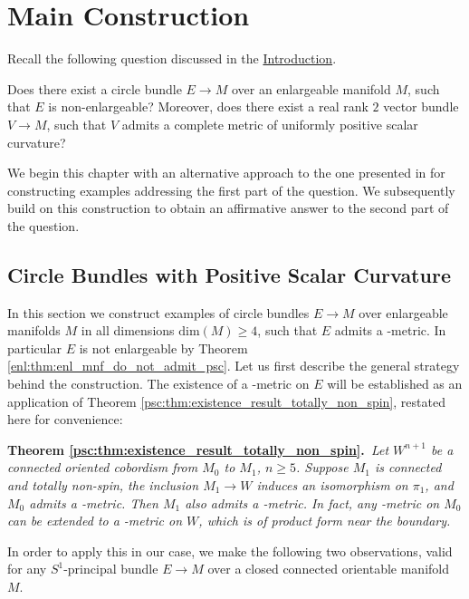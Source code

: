 \chapter{Main Construction}
\label{chapter:main_construction}

Recall the following question discussed in the \hyperref[chapter:intro]{Introduction}.

\begin{question*}
    Does there exist a circle bundle $E \to M$ over an enlargeable manifold $M$, such that $E$ is non-enlargeable? Moreover, does there exist a real rank $2$ vector bundle $V \to M$, such that $V$ admits a complete metric of uniformly positive scalar curvature?
\end{question*}

We begin this chapter with an alternative approach to the one presented in \cite{kumar2025circle} for constructing examples addressing the first part of the question. We subsequently build on this construction to obtain an affirmative answer to the second part of the question.  

\section{Circle Bundles with Positive Scalar Curvature}

 In this section we construct examples of circle bundles $E \to M$ over enlargeable manifolds $M$ in all dimensions $\mathrm{dim}(M) \geq 4$, such that $E$ admits a \psc-metric. In particular $E$ is not enlargeable by Theorem \ref{enl:thm:enl_mnf_do_not_admit_psc}. Let us first describe the general strategy behind the construction. The existence of a \psc-metric on $E$ will be established as an application of Theorem \ref{psc:thm:existence_result_totally_non_spin}, restated here for convenience:

\vspace{\baselineskip}
\noindent\textbf{Theorem \ref{psc:thm:existence_result_totally_non_spin}.}\itshape\ 
Let $W^{n+1}$ be a connected oriented cobordism from $M_0$ to $M_1$, $n \geq 5$. Suppose $M_1$ is connected and totally non-spin, the inclusion $M_1 \to W$ induces an isomorphism on $\pi_1$, and $M_0$ admits a \psc-metric. Then $M_1$ also admits a \psc-metric. In fact, any \psc-metric on $M_0$ can be extended to a \psc-metric on $W$, which is of product form near the boundary. 
\normalfont
\vspace{\baselineskip}

In order to apply this in our case, we make the following two observations, valid for any $S^1$-principal bundle $E \to M$ over a closed connected orientable manifold $M$. 

